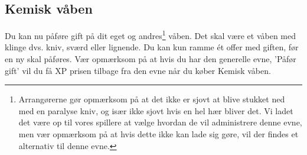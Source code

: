 \subsection*{Kemisk våben}
Du kan nu påføre gift på dit eget og andres\footnote{Arrangørerne gør opmærksom på at det ikke er sjovt at blive stukket ned med en paralyse kniv, og især ikke sjovt hvis en hel hær bliver det. Vi ladet det være op til vores spillere at vælge hvordan de vil administrere denne evne, men vær opmærksom på at hvis dette ikke kan lade sig gøre, vil der findes et alternativ til denne evne.} våben. Det skal være et våben med klinge dvs. kniv, sværd eller lignende. Du kan kun ramme ét offer med giften, før en ny skal påføres. Vær opmærksom på at hvis du har den generelle evne, 'Påfør gift' vil du få XP prisen tilbage fra den evne når du køber Kemisk våben.\\